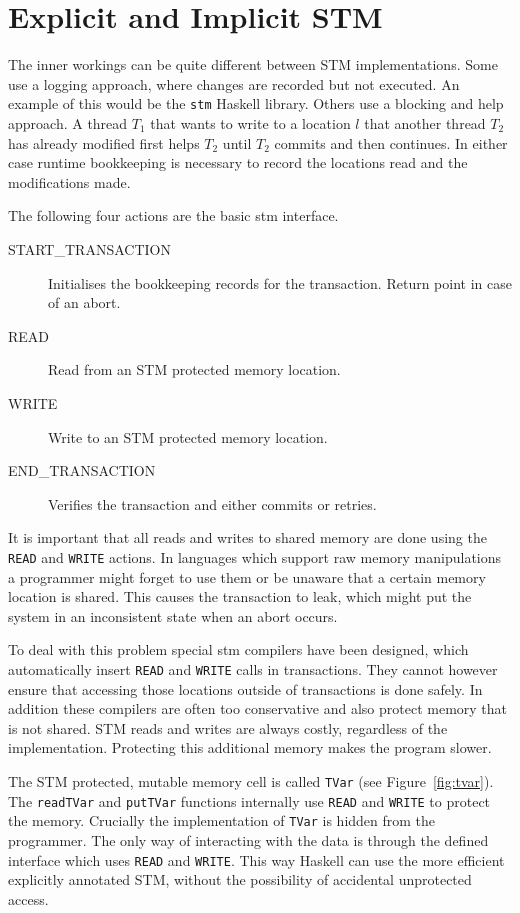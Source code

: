 \section{Explicit and Implicit STM}

\label{sec:explicit-implicit}

The inner workings can be quite different between STM implementations. Some use
a logging approach, where changes are recorded but not executed. An example of
this would be the \texttt{stm} Haskell library. Others use a blocking and help
approach. A thread $T_1$ that wants to write to a location $l$ that another
thread $T_2$ has already modified first helps $T_2$ until $T_2$ commits and then
continues. In either case runtime bookkeeping is necessary to record the
locations read and the modifications made.

The following four actions are the basic stm interface.

\begin{description}
\item[START\_TRANSACTION] Initialises the bookkeeping records for the
  transaction. Return point in case of an abort.
\item[READ] Read from an STM protected memory location.
\item[WRITE] Write to an STM protected memory location.
\item[END\_TRANSACTION] Verifies the transaction and either commits or retries.
\end{description}

It is important that all reads and writes to shared memory are done using the
\texttt{READ} and \texttt{WRITE} actions. In languages which support raw memory
manipulations a programmer might forget to use them or be unaware that a certain
memory location is shared. This causes the transaction to leak, which might put
the system in an inconsistent state when an abort occurs.

To deal with this problem special stm compilers have been designed, which
automatically insert \texttt{READ} and \texttt{WRITE} calls in transactions.
They cannot however ensure that accessing those locations outside of
transactions is done safely. In addition these compilers are often too
conservative and also protect memory that is not shared. STM reads and writes
are always costly, regardless of the implementation. Protecting this additional
memory makes the program slower.



The STM protected, mutable memory cell is called \texttt{TVar} (see
Figure~\ref{fig:tvar}). The \texttt{readTVar} and \texttt{putTVar} functions
internally use \texttt{READ} and \texttt{WRITE} to protect the memory. Crucially
the implementation of \texttt{TVar} is hidden from the programmer. The only way
of interacting with the data is through the defined interface which uses
\texttt{READ} and \texttt{WRITE}. This way Haskell can use the more efficient
explicitly annotated STM, without the possibility of accidental unprotected
access.


